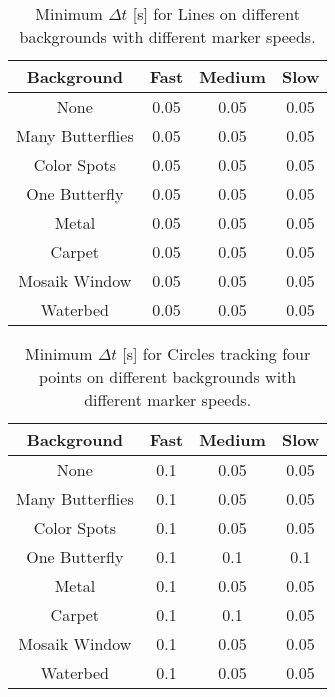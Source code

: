 \begin{table}[H]
\center
\begin{tabular}{|c|c|c|c|}
\hline
Background        & Fast & Medium & Slow \\ \hline
None & 0.05 & 0.05 & 0.05\\ \hline 
Many Butterflies & 0.05 & 0.05 & 0.05\\ \hline 
Color Spots & 0.05 & 0.05 & 0.05\\ \hline 
One Butterfly & 0.05 & 0.05 & 0.05\\ \hline 
Metal & 0.05 & 0.05 & 0.05\\ \hline 
Carpet & 0.05 & 0.05 & 0.05\\ \hline 
Mosaik Window & 0.05 & 0.05 & 0.05\\ \hline 
Waterbed & 0.05 & 0.05 & 0.05\\ \hline 
\end{tabular}
\caption{Minimum $\Delta t$ [s] for Lines on different backgrounds with different marker speeds.}
 \label{tb:min_dt_lines}
\end{table}

\begin{table}[H]
\center
\begin{tabular}{|c|c|c|c|}
\hline
Background       & Fast & Medium & Slow \\ \hline
None & 0.1 & 0.05 & 0.05\\ \hline 
Many Butterflies & 0.1 & 0.05 & 0.05\\ \hline 
Color Spots & 0.1 & 0.05 & 0.05\\ \hline 
One Butterfly & 0.1 & 0.1 & 0.1\\ \hline 
Metal & 0.1 & 0.05 & 0.05\\ \hline 
Carpet & 0.1 & 0.1 & 0.05\\ \hline 
Mosaik Window & 0.1 & 0.05 & 0.05\\ \hline 
Waterbed & 0.1 & 0.05 & 0.05\\ \hline 
\end{tabular}
\caption{Minimum $\Delta t$ [s] for Circles tracking four points on different backgrounds with different marker speeds.}
\label{tb:min_dt_circles}
\end{table}

